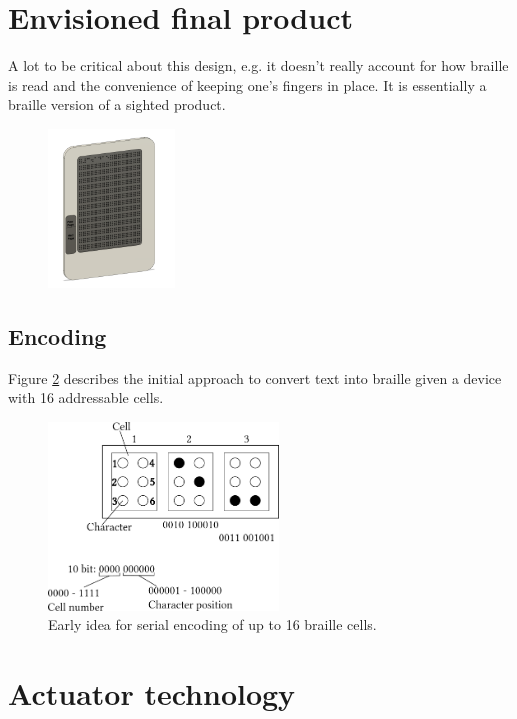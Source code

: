 
\section{Envisioned final product}
A lot to be critical about this design, e.g. it doesn't really account for how braille is read and the convenience of keeping one's fingers in place. It is essentially a braille version of a sighted product.
\begin{figure}[h]
\centering
    \includegraphics[width=0.3\textwidth]{figures/e-reader.png}
\caption{}
\label{fig:e-reader.png}
\end{figure}

\subsection{Encoding}
Figure \ref{fig:encoding.png} describes the initial approach to convert text into braille given a device with 16 addressable cells.
\begin{figure}[h]
\centering
    \includegraphics[height=5cm]{figures/encoding.png}
\caption{Early idea for serial encoding of up to 16 braille cells.}
\label{fig:encoding.png}
\end{figure}

\section{Actuator technology}
